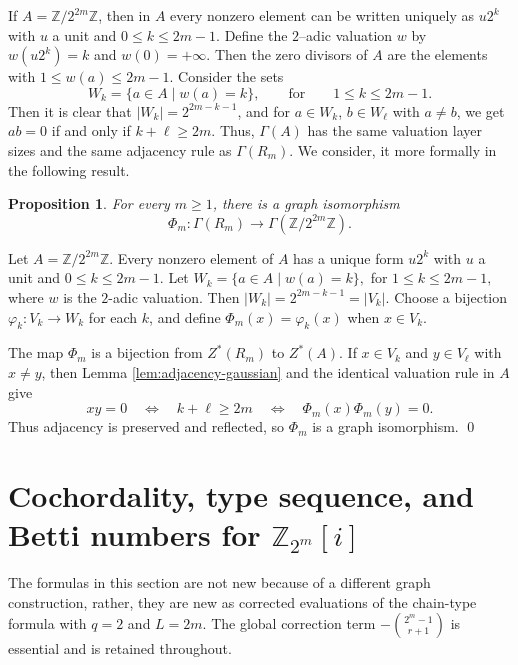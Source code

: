 \documentclass[12pt]{article}
\newtheorem{proposition}[theorem]{Proposition}
\theoremstyle{definition}
\renewenvironment{proof}{{\bf \noindent Proof.}}{\qed}
\begin{document}
\medskip

If $A = \mathbb Z/2^{2m}\mathbb Z$, then in $A$ every nonzero element can be written 	uniquely as $u2^k$ with $u$ a unit and $0\le k\le 2m-1$. Define the $2$–adic valuation $w$ by $w(u2^k)=k$ and $w(0)=+\infty$. Then the zero divisors of $A$ are the elements with $1\le w(a)\le 2m-1$. Consider the sets
\[
W_k = \{a\in A \mid w(a)=k\},\qquad\text{for}\qquad 1\le k\le 2m-1.
\]
Then it is clear that $|W_k| = 2^{2m-k-1}$, and for
$a\in W_k$, $b\in W_\ell$ with $a\neq b$, we get  $ab=0$ if and only if $k+\ell\ge 2m.$	Thus, $\Gamma(A)$ has the same valuation layer sizes and the same adjacency
rule as $\Gamma(R_m)$. We consider, it more formally in the following result.	

\begin{proposition}\label{prop:gaussian-iso}
	For every $m\geq 1$, there is a graph isomorphism
	$$
	\Phi_m:\Gamma(R_m)\longrightarrow \Gamma(\mathbb{Z}/2^{2m}\mathbb{Z}).
	$$
\end{proposition}

\begin{proof}
	Let $A=\mathbb{Z}/2^{2m}\mathbb{Z}$.  Every nonzero element of $A$ has a unique form $u2^k$ with $u$ a unit and $0\leq k\leq 2m-1$.  Let
	$ W_k=\{a\in A\mid w(a)=k\},$ for $ 1\leq k\leq 2m-1, $
	where $w$ is the $2$-adic valuation.  Then
	$ |W_k|=2^{2m-k-1}=|V_k|. $
	Choose a bijection $\varphi_k:V_k\to W_k$ for each $k$, and define $\Phi_m(x)=\varphi_k(x)$ when $x\in V_k$.
	
	\medskip
	
	The map $\Phi_m$ is a bijection from $Z^*(R_m)$ to $Z^*(A)$.  If $x\in V_k$ and $y\in V_\ell$ with $x\neq y$, then Lemma \ref{lem:adjacency-gaussian} and the identical valuation rule in $A$ give
	$$
	xy=0\quad\Longleftrightarrow\quad k+\ell\geq 2m\quad\Longleftrightarrow\quad \Phi_m(x)\Phi_m(y)=0.
	$$
	Thus adjacency is preserved and reflected, so $\Phi_m$ is a graph isomorphism.
\end{proof}

\medskip

\section{Cochordality, type sequence, and Betti numbers for \texorpdfstring{$\mathbb{Z}_{2^m}[i]$}{Z_2^m[i]}}\label{sec:gaussian-betti}
 The formulas in this section are not new because of a different graph construction, rather, they are new as corrected evaluations of the chain-type formula with $q=2$ and $L=2m$.  The global correction term $-\binom{2^m-1}{r+1}$ is essential and is retained throughout.
\end{document}
